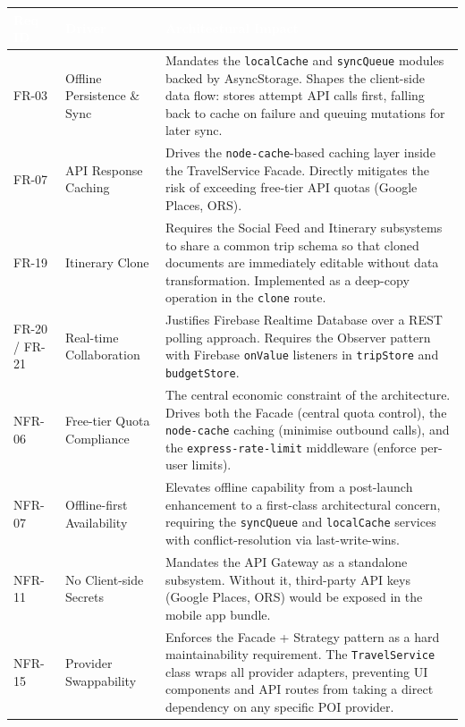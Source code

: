 \documentclass[12pt, a4paper]{article}
\newcommand{\reqid}[1]{\textsc{\small #1}}
\newcommand{\thcell}[1]{\textcolor{white}{\textbf{\small #1}}}
\begin{document}
\vspace{0.6em}
\begin{longtable}{C{1.8cm} L{4.5cm} L{7.4cm}}
\toprule
{}
\thcell{Req ID} & \thcell{Driver} & \thcell{Architectural Impact} \\
\midrule
\endhead
\bottomrule
\endfoot

\reqid{FR-03} & Offline Persistence \& Sync &
Mandates the \texttt{localCache} and \texttt{syncQueue} modules backed by AsyncStorage. Shapes the client-side data flow: stores attempt API calls first, falling back to cache on failure and queuing mutations for later sync. \\

\reqid{FR-07} & API Response Caching &
Drives the \texttt{node-cache}-based caching layer inside the TravelService Facade. Directly mitigates the risk of exceeding free-tier API quotas (Google Places, ORS). \\

\reqid{FR-19} & Itinerary Clone &
Requires the Social Feed and Itinerary subsystems to share a common trip schema so that cloned documents are immediately editable without data transformation. Implemented as a deep-copy operation in the \texttt{clone} route. \\

\reqid{FR-20 / FR-21} & Real-time Collaboration &
Justifies Firebase Realtime Database over a REST polling approach. Requires the Observer pattern with Firebase \texttt{onValue} listeners in \texttt{tripStore} and \texttt{budgetStore}. \\

\reqid{NFR-06} & Free-tier Quota Compliance &
The central economic constraint of the architecture. Drives both the Facade (central quota control), the \texttt{node-cache} caching (minimise outbound calls), and the \texttt{express-rate-limit} middleware (enforce per-user limits). \\

\reqid{NFR-07} & Offline-first Availability &
Elevates offline capability from a post-launch enhancement to a first-class architectural concern, requiring the \texttt{syncQueue} and \texttt{localCache} services with conflict-resolution via last-write-wins. \\

\reqid{NFR-11} & No Client-side Secrets &
Mandates the API Gateway as a standalone subsystem. Without it, third-party API keys (Google Places, ORS) would be exposed in the mobile app bundle. \\

\reqid{NFR-15} & Provider Swappability &
Enforces the Facade + Strategy pattern as a hard maintainability requirement. The \texttt{TravelService} class wraps all provider adapters, preventing UI components and API routes from taking a direct dependency on any specific POI provider. \\

\end{longtable}
\end{document}
